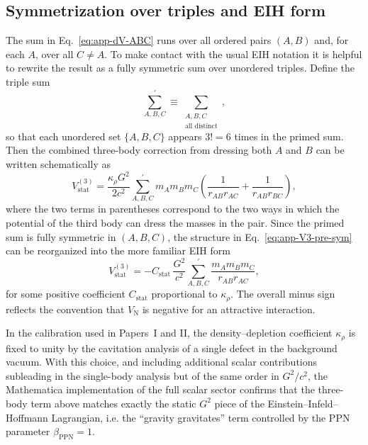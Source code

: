 \documentclass[11pt]{article}
\begin{document}
\subsection{Symmetrization over triples and EIH form}

The sum in Eq.~\eqref{eq:app-dV-ABC} runs over all ordered pairs
$(A,B)$ and, for each $A$, over all $C\neq A$.
To make contact with the usual EIH notation it is helpful to rewrite
the result as a fully symmetric sum over unordered triples.
Define the triple sum
\begin{equation}
  \sum_{A,B,C}^{\prime}
  \equiv
  \sum_{\substack{A,B,C \\ \text{all distinct}}},
\end{equation}
so that each unordered set $\{A,B,C\}$ appears $3!=6$ times in the
primed sum.
Then the combined three-body correction from dressing both $A$ and
$B$ can be written schematically as
\begin{equation}
  V_{\text{stat}}^{(3)}
  = \frac{\kappa_\rho G^2}{2 c^2}
    \sum_{A,B,C}^{\prime}
    m_A m_B m_C
    \left(
      \frac{1}{r_{AB} r_{AC}}
      + \frac{1}{r_{AB} r_{BC}}
    \right),
  \label{eq:app-V3-pre-sym}
\end{equation}
where the two terms in parentheses correspond to the two ways in
which the potential of the third body can dress the masses in the
pair.
Since the primed sum is fully symmetric in $(A,B,C)$, the structure
in Eq.~\eqref{eq:app-V3-pre-sym} can be reorganized into the more
familiar EIH form
\begin{equation}
  V_{\text{stat}}^{(3)}
  = -C_{\text{stat}}\,
    \frac{G^2}{c^2}
    \sum_{A,B,C}^{\prime}
    \frac{m_A m_B m_C}{r_{AB} r_{AC}},
  \label{eq:app-V3-EIH-form}
\end{equation}
for some positive coefficient $C_{\text{stat}}$ proportional to
$\kappa_\rho$.
The overall minus sign reflects the convention that $V_{\text{N}}$
is negative for an attractive interaction.

In the calibration used in Papers~I and II, the density–depletion
coefficient $\kappa_\rho$ is fixed to unity by the cavitation analysis
of a single defect in the background vacuum.
With this choice, and including additional scalar contributions
subleading in the single-body analysis but of the same order in
$G^2/c^2$, the Mathematica implementation of the full scalar sector
confirms that the three-body term above matches exactly the static
$G^2$ piece of the Einstein--Infeld--Hoffmann Lagrangian, i.e. the
``gravity gravitates'' term controlled by the PPN parameter
$\beta_{\mathrm{PPN}}=1$.
\end{document}
